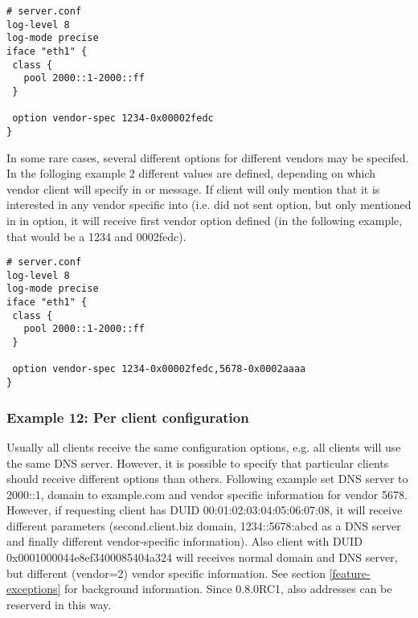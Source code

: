 \begin{lstlisting}
# server.conf
log-level 8
log-mode precise
iface "eth1" {
 class {
   pool 2000::1-2000::ff
 }

 option vendor-spec 1234-0x00002fedc
}
\end{lstlisting}

In some rare cases, several different options for different vendors
may be specifed. In the folloging example 2 different values are
defined, depending on which vendor client will specify in  or
 message. If client will only mention that it is interested in
any vendor specific into (i.e. did not sent  option, but
only mentioned in in  option, it will receive
first vendor option defined (in the following example, that would be a
1234 and 0002fedc).

\begin{lstlisting}
# server.conf
log-level 8
log-mode precise
iface "eth1" {
 class {
   pool 2000::1-2000::ff
 }

 option vendor-spec 1234-0x00002fedc,5678-0x0002aaaa
}
\end{lstlisting}

\subsubsection{Example 12: Per client configuration}
\label{example-server-exceptions}
Usually all clients receive the same configuration options, e.g. all
clients will use the same DNS server. However, it is possible to
specify that particular clients should receive different options than
others. Following example set DNS server to 2000::1, domain
to example.com and vendor specific information for vendor 5678.
However, if requesting client has DUID 00:01:02:03:04:05:06:07:08, it
will receive different parameters (second.client.biz domain,
1234::5678:abcd as a DNS server and finally different vendor-specific
information). Also client with DUID 0x0001000044e8ef3400085404a324
will receives normal domain and DNS server, but different (vendor=2)
vendor specific information. See section \ref{feature-exceptions} for
background information. Since 0.8.0RC1, also addresses can be reserverd
in this way.

